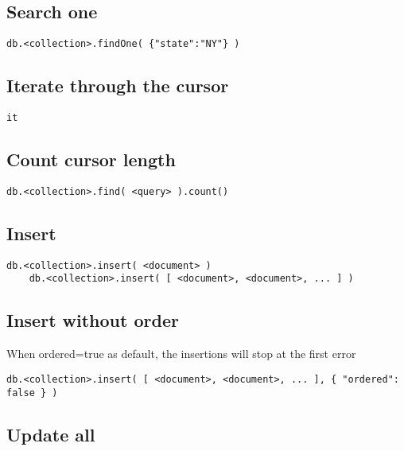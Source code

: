 \documentclass{article}
\begin{document}
\subsection{Search one}

\begin{lstlisting}[style=js]
    db.<collection>.findOne( {"state":"NY"} )
\end{lstlisting}

\subsection{Iterate through the cursor}

\begin{lstlisting}[style=js]
    it
\end{lstlisting}

\subsection{Count cursor length}

\begin{lstlisting}[style=js]
    db.<collection>.find( <query> ).count()
\end{lstlisting}

\subsection{Insert}

\begin{lstlisting}[style=js]
    db.<collection>.insert( <document> )
    db.<collection>.insert( [ <document>, <document>, ... ] )
\end{lstlisting}

\subsection{Insert without order}

When ordered=true as default, the insertions will stop at the first error

\begin{lstlisting}[style=js]
    db.<collection>.insert( [ <document>, <document>, ... ], { "ordered": false } )
\end{lstlisting}

\subsection{Update all}
\end{document}
